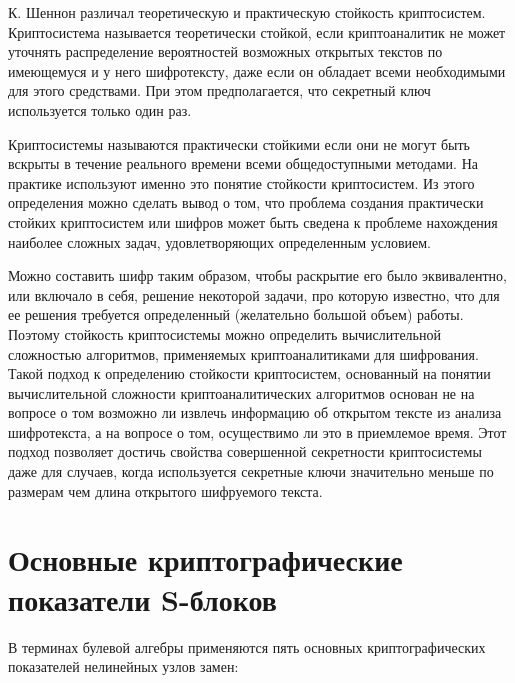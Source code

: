 К. Шеннон различал теоретическую и практическую стойкость криптосистем.
Криптосистема называется теоретически стойкой, если криптоаналитик не может
уточнять распределение вероятностей возможных открытых текстов по имеющемуся и у
него шифротексту, даже если он обладает всеми необходимыми для этого средствами.
При этом предполагается, что секретный ключ используется только один раз.

Криптосистемы называются практически стойкими если они не могут быть вскрыты в
течение реального времени всеми общедоступными методами. На практике используют
именно это понятие стойкости криптосистем. Из этого определения можно сделать
вывод о том, что проблема создания практически стойких криптосистем или шифров
может быть сведена к проблеме нахождения наиболее сложных задач, удовлетворяющих
определенным условием.

Можно составить шифр таким образом, чтобы раскрытие его было эквивалентно, или
включало в себя, решение некоторой задачи, про которую известно, что для ее
решения требуется определенный (желательно большой объем) работы. Поэтому
стойкость криптосистемы можно определить вычислительной сложностью алгоритмов,
применяемых криптоаналитиками для шифрования. Такой подход к определению
стойкости криптосистем, основанный на понятии вычислительной сложности
криптоаналитических алгоритмов основан не на вопросе о том возможно ли извлечь
информацию об открытом тексте из анализа шифротекста, а на вопросе о том,
осуществимо ли это в приемлемое время. Этот подход позволяет достичь свойства
совершенной секретности криптосистемы даже для случаев, когда используется
секретные ключи значительно меньше по размерам чем длина открытого шифруемого
текста.

\section{Основные криптографические показатели S-блоков}

В терминах булевой алгебры применяются пять основных криптографических
показателей нелинейных узлов замен:


